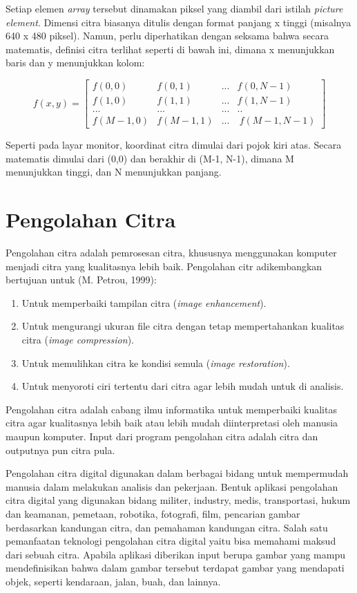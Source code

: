 Setiap elemen \textit{array} tersebut dinamakan piksel yang diambil dari istilah \textit{picture element}. Dimensi citra biasanya ditulis dengan format panjang x tinggi (misalnya 640 x 480 piksel). Namun, perlu diperhatikan dengan seksama bahwa secara matematis, definisi citra terlihat seperti di bawah ini, dimana x menunjukkan baris dan y menunjukkan kolom:

\[
f(x,y)=
\begin{bmatrix}
	f\left(0,0\right)  & f\left(0,1\right) & ... & f\left(0,N-1\right) \\ 
	f\left(1,0\right)  & f\left(1,1\right) & ... & f\left(1,N-1\right) \\
	... & ... & ... & .. \\
	f\left(M-1,0\right) & f\left(M-1,1\right) & ... & \ f\left(M-1,N-1\right)
\end{bmatrix}
\]

Seperti pada layar monitor, koordinat citra dimulai dari pojok kiri atas. Secara matematis dimulai dari (0,0) dan berakhir di (M-1, N-1), dimana M menunjukkan tinggi, dan N menunjukkan panjang.

\section{Pengolahan Citra}
\hspace{1,2cm}Pengolahan citra adalah pemrosesan citra, khususnya menggunakan komputer menjadi citra yang kualitasnya lebih baik. Pengolahan citr adikembangkan bertujuan untuk (M. Petrou, 1999):
\begin{enumerate}
	\item Untuk memperbaiki tampilan citra (\textit{image enhancement}).
	\item Untuk mengurangi ukuran file citra dengan tetap mempertahankan kualitas citra (\textit{image compression}).
	\item Untuk memulihkan citra ke kondisi semula (\textit{image restoration}). 
	\item Untuk menyoroti ciri tertentu dari citra agar lebih mudah untuk di analisis. 
\end{enumerate}

Pengolahan citra adalah cabang ilmu informatika untuk memperbaiki kualitas citra agar kualitasnya lebih baik atau lebih mudah diinterpretasi oleh manusia maupun komputer. Input dari program pengolahan citra adalah citra dan outputnya pun citra pula.

Pengolahan citra digital digunakan dalam berbagai bidang untuk mempermudah manusia dalam melakukan analisis dan pekerjaan. Bentuk aplikasi pengolahan citra digital yang digunakan bidang militer, industry, medis, transportasi, hukum dan keamanan, pemetaan, robotika, fotografi, film, pencarian gambar berdasarkan kandungan citra, dan pemahaman kandungan citra. Salah satu pemanfaatan teknologi pengolahan citra digital yaitu bisa memahami maksud dari sebuah citra. Apabila aplikasi diberikan input berupa gambar yang mampu mendefinisikan bahwa dalam gambar tersebut terdapat gambar yang mendapati objek, seperti kendaraan, jalan, buah, dan lainnya.


